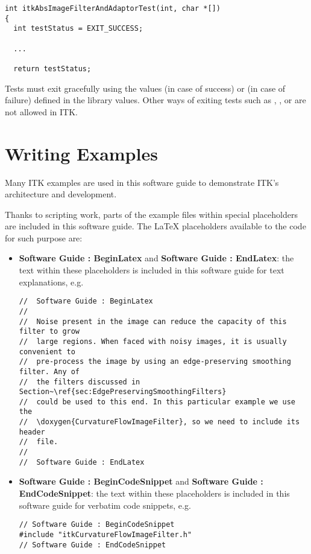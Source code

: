 \small
\begin{verbatim}
int itkAbsImageFilterAndAdaptorTest(int, char *[])
{
  int testStatus = EXIT_SUCCESS;

  ...

  return testStatus;
\end{verbatim}
\normalsize

Tests must exit gracefully using the values  (in case of
success) or  (in case of failure) defined in the
 library values. Other ways of exiting tests such as
, , or  are not
allowed in ITK.


\section{Writing Examples}
\label{sec:WritingExamples}

Many ITK examples are used in this software guide to demonstrate ITK's
architecture and development.

Thanks to scripting work, parts of the  example files within
special placeholders are included in this software guide. The \LaTeX
placeholders available to the code for such purpose are:

\begin{itemize}
\item \textbf{Software Guide : BeginLatex} and
\textbf{Software Guide : EndLatex}: the text within these placeholders is
included in this software guide for text explanations, e.g.

\small
\begin{verbatim}
//  Software Guide : BeginLatex
//
//  Noise present in the image can reduce the capacity of this filter to grow
//  large regions. When faced with noisy images, it is usually convenient to
//  pre-process the image by using an edge-preserving smoothing filter. Any of
//  the filters discussed in Section~\ref{sec:EdgePreservingSmoothingFilters}
//  could be used to this end. In this particular example we use the
//  \doxygen{CurvatureFlowImageFilter}, so we need to include its header
//  file.
//
//  Software Guide : EndLatex
\end{verbatim}
\normalsize

\item \textbf{Software Guide : BeginCodeSnippet} and
\textbf{Software Guide : EndCodeSnippet}: the text within these placeholders is
included in this software guide for verbatim code snippets, e.g.

\small
\begin{verbatim}
// Software Guide : BeginCodeSnippet
#include "itkCurvatureFlowImageFilter.h"
// Software Guide : EndCodeSnippet
\end{verbatim}
\normalsize

\end{itemize}

